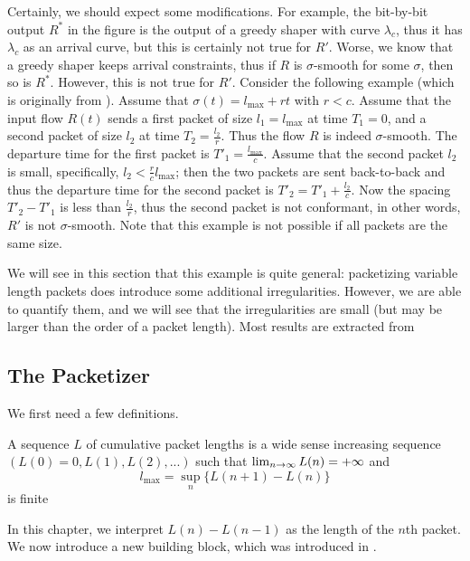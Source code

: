 Certainly, we should expect some modifications. For example, the
bit-by-bit output $R^*$ in the figure is the output of a greedy
shaper with curve $\lambda_c$, thus it has $\lambda_c$ as an
arrival curve, but this is certainly not true for $R'$. Worse, we
know that a greedy shaper keeps arrival constraints, thus if $R$
is $\sigma$-smooth for some $\sigma$, then so is $R^*$. However,
this is not true for $R'$. Consider the following example (which
is originally from \cite{guerin-00}). Assume that
$\sigma(t)=l_{\max}+rt$ with $r<c$. Assume that the input flow
$R(t)$ sends a first packet of size $l_1 = l_{\max}$ at time $T_1=
0$, and a second packet of size $l_2$ at time $T_2=\frac{l_2}{r}$.
Thus the flow $R$ is indeed $\sigma$-smooth. The departure time
for the first packet is $T'_1=\frac{l_{\max}}{c}$. Assume that the
second packet $l_2$ is small, specifically, $l_2 <
\frac{r}{c}l_{\max}$; then the two packets are sent back-to-back
and thus the departure time for the second packet is
$T'_2=T'_1+\frac{l_2}{c}$. Now the spacing $T'_2 - T'_1$ is less
than $\frac{l_2}{r}$, thus the second packet is not conformant, in
other words, $R'$ is not $\sigma$-smooth. Note that this example
is not possible if all packets are the same size.

We will see in this section that this example is quite general:
packetizing variable length packets does introduce some additional
irregularities. However, we are able to quantify them, and we will
see that the irregularities are small (but may be larger than the
order of a packet length). Most results are extracted from
\cite{leb01}

\subsection{The Packetizer}

We first need a few definitions.
\begin{definition}
 A sequence $L$ of cumulative packet lengths is a
wide sense increasing sequence $(L(0)=0, L(1), L(2), ...)$ such
that $\lim_{n \rightarrow \infty}L(n)=+\infty$ and $$l_{\max}=\sup_n\{L(n+1)-L(n)\}$$ is finite
%
\end{definition}
In this chapter, we interpret $L(n)-L(n-1)$ as the length of the
$n$th packet. We now introduce a new building block, which was
introduced in \cite{Changbook}.

